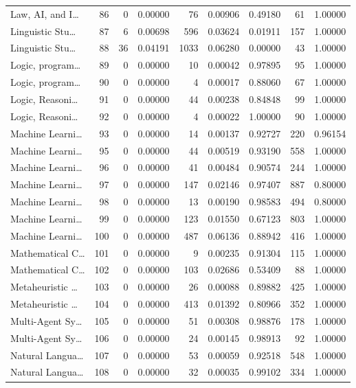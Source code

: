 \begin{table}
\begin{tabular}{lrrrrrrrr}
Law, AI, and I… & 86 & 0 & 0.00000 & 76 & 0.00906 & 0.49180 & 61 & 1.00000 \\
Linguistic Stu… & 87 & 6 & 0.00698 & 596 & 0.03624 & 0.01911 & 157 & 1.00000 \\
Linguistic Stu… & 88 & 36 & 0.04191 & 1033 & 0.06280 & 0.00000 & 43 & 1.00000 \\
Logic, program… & 89 & 0 & 0.00000 & 10 & 0.00042 & 0.97895 & 95 & 1.00000 \\
Logic, program… & 90 & 0 & 0.00000 & 4 & 0.00017 & 0.88060 & 67 & 1.00000 \\
Logic, Reasoni… & 91 & 0 & 0.00000 & 44 & 0.00238 & 0.84848 & 99 & 1.00000 \\
Logic, Reasoni… & 92 & 0 & 0.00000 & 4 & 0.00022 & 1.00000 & 90 & 1.00000 \\
Machine Learni… & 93 & 0 & 0.00000 & 14 & 0.00137 & 0.92727 & 220 & 0.96154 \\
Machine Learni… & 95 & 0 & 0.00000 & 44 & 0.00519 & 0.93190 & 558 & 1.00000 \\
Machine Learni… & 96 & 0 & 0.00000 & 41 & 0.00484 & 0.90574 & 244 & 1.00000 \\
Machine Learni… & 97 & 0 & 0.00000 & 147 & 0.02146 & 0.97407 & 887 & 0.80000 \\
Machine Learni… & 98 & 0 & 0.00000 & 13 & 0.00190 & 0.98583 & 494 & 0.80000 \\
Machine Learni… & 99 & 0 & 0.00000 & 123 & 0.01550 & 0.67123 & 803 & 1.00000 \\
Machine Learni… & 100 & 0 & 0.00000 & 487 & 0.06136 & 0.88942 & 416 & 1.00000 \\
Mathematical C… & 101 & 0 & 0.00000 & 9 & 0.00235 & 0.91304 & 115 & 1.00000 \\
Mathematical C… & 102 & 0 & 0.00000 & 103 & 0.02686 & 0.53409 & 88 & 1.00000 \\
Metaheuristic … & 103 & 0 & 0.00000 & 26 & 0.00088 & 0.89882 & 425 & 1.00000 \\
Metaheuristic … & 104 & 0 & 0.00000 & 413 & 0.01392 & 0.80966 & 352 & 1.00000 \\
Multi-Agent Sy… & 105 & 0 & 0.00000 & 51 & 0.00308 & 0.98876 & 178 & 1.00000 \\
Multi-Agent Sy… & 106 & 0 & 0.00000 & 24 & 0.00145 & 0.98913 & 92 & 1.00000 \\
Natural Langua… & 107 & 0 & 0.00000 & 53 & 0.00059 & 0.92518 & 548 & 1.00000 \\
Natural Langua… & 108 & 0 & 0.00000 & 32 & 0.00035 & 0.99102 & 334 & 1.00000 \\

\end{tabular}
\end{table}
